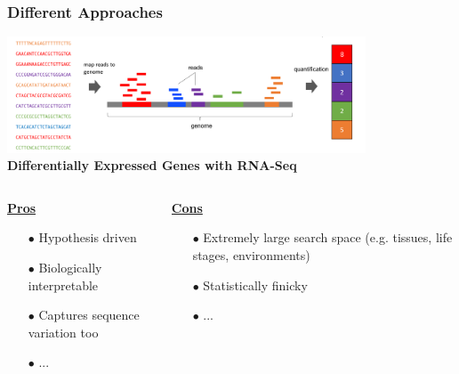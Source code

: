 \documentclass{beamer}
\begin{document}
\begin{frame}
	\frametitle{Different Approaches}
	
	\centering 	\includegraphics[keepaspectratio, width  = 0.8\textwidth]{img/rnaSeqSection}\\
	\vspace{10pt}
	\centering \textbf{		\Large Differentially Expressed Genes with RNA-Seq }
	\vspace{10pt}
	\begin{columns}
		\begin{column}{0.5\textwidth}
			\centering			\underline{\textbf{Pros}}
			\begin{itemize}
				\item[$\bullet$] Hypothesis driven
				\item[$\bullet$] Biologically interpretable
				\item[$\bullet$] Captures sequence variation too
				\item[$\bullet$] ... 
			\end{itemize}
		\end{column}
		\begin{column}{0.5\textwidth}
			\centering			\underline{\textbf{Cons}}
			\begin{itemize}
				\item[$\bullet$] Extremely large search space (e.g. tissues, life stages, environments)
				\item[$\bullet$] Statistically finicky
				\item[$\bullet$] ... 
			\end{itemize}
		\end{column}
		
		
	\end{columns}
\end{frame}



	
	
\end{document}

